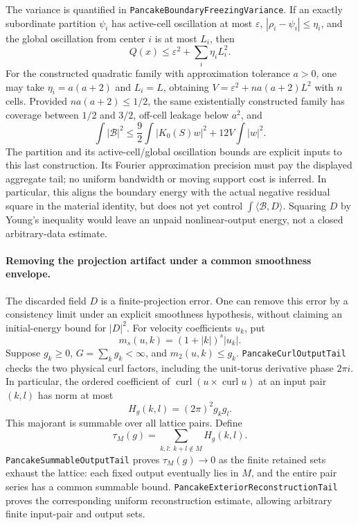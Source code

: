 \documentclass[11pt]{article}
\theoremstyle{definition}
\begin{document}
The variance is quantified in \texttt{PancakeBoundaryFreezingVariance}.
If an exactly subordinate partition $\psi_i$ has active-cell oscillation
at most $\varepsilon$, $|\rho_i-\psi_i|\le\eta_i$, and the global
oscillation from center $i$ is at most $L_i$, then
\[
 Q(x)\le\varepsilon^2+\sum_i\eta_iL_i^2.
\]
For the constructed quadratic family with approximation tolerance $a>0$,
one may take $\eta_i=a(a+2)$ and $L_i=L$, obtaining
$V=\varepsilon^2+na(a+2)L^2$ with $n$ cells. Provided
$na(a+2)\le1/2$, the same
existentially constructed family has coverage between $1/2$ and $3/2$,
off-cell leakage below $a^2$, and
\[
 \int|\mathcal B|^2
   \le\frac92\int|K_0(S)w|^2+12V\int|w|^2.
\]
The partition and its active-cell/global oscillation bounds are explicit
inputs to this last construction. Its Fourier approximation precision
must pay the displayed aggregate tail; no uniform bandwidth or moving
support cost is inferred. In particular, this aligns the boundary energy
with the actual negative residual square in the material identity, but
does not yet control $\int\langle\mathcal B,D\rangle$. Squaring $D$ by
Young's inequality would leave an unpaid nonlinear-output energy, not a
closed arbitrary-data estimate.

\paragraph{Removing the projection artifact under a common smoothness envelope.}
The discarded field $D$ is a finite-projection error. One can remove this
error by a consistency limit under an explicit smoothness hypothesis,
without claiming an initial-energy bound for $|D|^2$.
For velocity coefficients $u_k$, put
\[
 m_s(u,k)=(1+|k|)^s|u_k|.
\]
Suppose $g_k\ge0$, $G=\sum_k g_k<\infty$, and $m_2(u,k)\le g_k$.
\texttt{PancakeCurlOutputTail} checks the two physical curl factors,
including the unit-torus derivative phase $2\pi i$. In particular, the
ordered coefficient of $\operatorname{curl}(u\times\operatorname{curl}u)$
at an input pair $(k,l)$ has norm at most
\[
 H_g(k,l)=(2\pi)^2g_kg_l.
\]
This majorant is summable over all lattice pairs. Define
\[
 \tau_M(g)=\sum_{k,l:\ k+l\notin M}H_g(k,l).
\]
\texttt{PancakeSummableOutputTail} proves $\tau_M(g)\to0$ as the finite
retained sets exhaust the lattice: each fixed output eventually lies in
$M$, and the entire pair series has a common summable bound.
\texttt{PancakeExteriorReconstructionTail} proves the corresponding
uniform reconstruction estimate, allowing arbitrary finite input-pair
and output sets.
\end{document}

